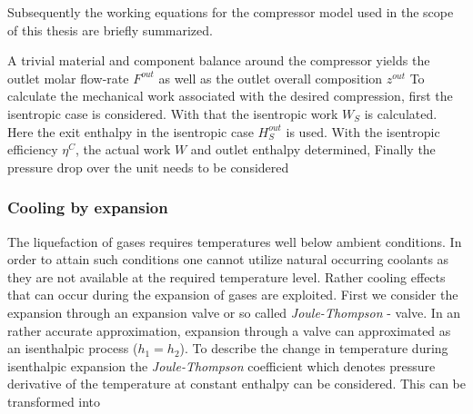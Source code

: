         Subsequently the working equations for the compressor model used in the scope of this thesis are
        briefly summarized.

        A trivial material and component balance around the compressor yields the outlet molar flow-rate $F^{out}$
        as well as the outlet overall composition $z^{out}$
    	To calculate the mechanical work associated with the desired compression,
        first the isentropic case
        is considered. With that the isentropic work $W_S$ is calculated. Here the exit enthalpy in the 
        isentropic case $H_S^{out}$ is used. 
        With the isentropic efficiency $\eta^C$, the actual work $W$ and outlet enthalpy determined, 
        Finally the pressure drop over the unit needs to be considered

    \subsubsection{Cooling by expansion}
        The liquefaction of gases requires temperatures well below ambient conditions. In order to attain
        such conditions one cannot utilize natural occurring coolants as they are not available at the required
        temperature level. Rather cooling effects that can occur during the expansion of gases are exploited.
        First we consider the expansion through an expansion valve or so called \emph{Joule-Thompson} - valve.
        In an rather accurate approximation, expansion through a valve can approximated as an isenthalpic
        process ($h_1 = h_2$). To describe the change in temperature during isenthalpic expansion
        the \emph{Joule-Thompson} coefficient
        which denotes pressure derivative of the temperature at constant enthalpy can be considered.
        This can be transformed into

